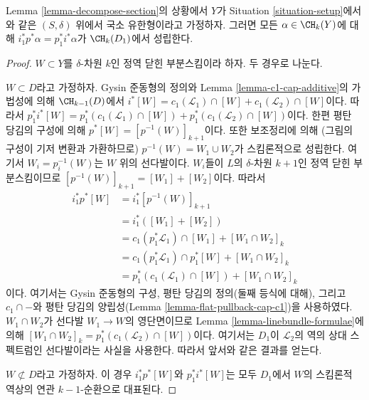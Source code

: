 \begin{lemma}
\label{lemma-decompose-section-formulae}
Lemma \ref{lemma-decompose-section}의 상황에서 $Y$가 Situation
\ref{situation-setup}에서와 같은 $(S, \delta)$ 위에서 국소 유한형이라고
가정하자. 그러면 모든 $\alpha \in \CH_k(Y)$에 대해
$i_1^*p^*\alpha = p_1^*i^*\alpha$가 $\CH_k(D_1)$에서 성립한다.
\end{lemma}

\begin{proof}
$W \subset Y$를 $\delta$-차원 $k$인 정역 닫힌 부분스킴이라 하자.
두 경우로 나눈다.

\medskip\noindent
$W \subset D$라고 가정하자. Gysin 준동형의 정의와 Lemma
\ref{lemma-c1-cap-additive}의 가법성에 의해 $\CH_{k - 1}(D)$에서
$i^*[W] = c_1(\mathcal{L}_1) \cap [W] + c_1(\mathcal{L}_2) \cap [W]$이다.
따라서 $p_1^*i^*[W] =
p_1^*(c_1(\mathcal{L}_1) \cap [W]) + p_1^*(c_1(\mathcal{L}_2) \cap [W])$이다.
한편 평탄 당김의 구성에 의해
$p^*[W] = [p^{-1}(W)]_{k + 1}$이다. 또한 보조정리에 의해
(그림의 구성이 기저 변환과 가환하므로)
$p^{-1}(W) = W_1 \cup W_2$가 스킴론적으로 성립한다. 여기서
$W_i = p_i^{-1}(W)$는 $W$ 위의 선다발이다. $W_i$들이 $L$의
$\delta$-차원 $k + 1$인 정역 닫힌 부분스킴이므로
$[p^{-1}(W)]_{k + 1} = [W_1] + [W_2]$이다. 따라서
\begin{align*}
i_1^*p^*[W]
& =
i_1^*[p^{-1}(W)]_{k + 1} \\
& =
i_1^*([W_1] + [W_2]) \\
& =
c_1(p_1^*\mathcal{L}_1) \cap [W_1] + [W_1 \cap W_2]_k \\
& =
c_1(p_1^*\mathcal{L}_1) \cap p_1^*[W] + [W_1 \cap W_2]_k \\
& =
p_1^*(c_1(\mathcal{L}_1) \cap [W]) + [W_1 \cap W_2]_k
\end{align*}
이다. 여기서는 Gysin 준동형의 구성, 평탄 당김의 정의(둘째 등식에
대해), 그리고 $c_1 \cap -$와 평탄 당김의 양립성(Lemma
\ref{lemma-flat-pullback-cap-c1})을 사용하였다.
$W_1 \cap W_2$가 선다발 $W_1 \to W$의 영단면이므로 Lemma
\ref{lemma-linebundle-formulae}에 의해
$[W_1 \cap W_2]_k = p_1^*(c_1(\mathcal{L}_2) \cap [W])$이다.
여기서는 $D_1$이 $\mathcal{L}_2$의 역의 상대 스펙트럼인 선다발이라는
사실을 사용한다. 따라서 앞서와 같은 결과를 얻는다.

\medskip\noindent
$W \not \subset D$라고 가정하자. 이 경우 $i_1^*p^*[W]$와
$p_1^*i^*[W]$는 모두 $D_1$에서 $W$의 스킴론적 역상의 연관
$k - 1$-순환으로 대표된다.
\end{proof}


